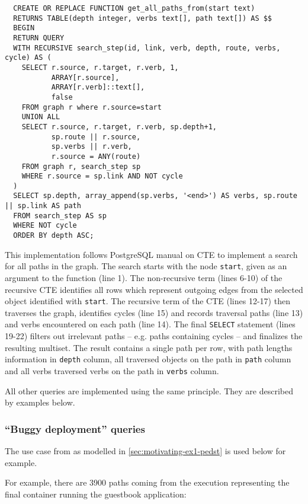 \begin{verbatim}
  CREATE OR REPLACE FUNCTION get_all_paths_from(start text)
  RETURNS TABLE(depth integer, verbs text[], path text[]) AS $$
  BEGIN
  RETURN QUERY
  WITH RECURSIVE search_step(id, link, verb, depth, route, verbs, cycle) AS (
    SELECT r.source, r.target, r.verb, 1,
           ARRAY[r.source],
           ARRAY[r.verb]::text[],
           false
    FROM graph r where r.source=start
    UNION ALL
    SELECT r.source, r.target, r.verb, sp.depth+1,
           sp.route || r.source,
           sp.verbs || r.verb,
           r.source = ANY(route)
    FROM graph r, search_step sp
    WHERE r.source = sp.link AND NOT cycle
  )
  SELECT sp.depth, array_append(sp.verbs, '<end>') AS verbs, sp.route || sp.link AS path
  FROM search_step AS sp
  WHERE NOT cycle
  ORDER BY depth ASC;
\end{verbatim}

This implementation follows PostgreSQL manual on CTE \cite{PostgreSQL-ctes-15:online}  to implement a search for all paths in the graph. The search starts with the node \texttt{start}, given as an argument to the function (line 1). The non-recursive term (lines 6-10) of the recursive CTE identifies all rows which represent outgoing edges from the selected object identified with \texttt{start}. The recursive term of the CTE (lines 12-17) then traverses the graph, identifies cycles (line 15) and records traversal paths (line 13) and verbs encountered on each path (line 14). The final \texttt{SELECT} statement (lines 19-22) filters out irrelevant paths -- e.g. paths containing cycles -- and finalizes the resulting multiset. The result contains a single path per row, with path lengths information in \texttt{depth} column, all traversed objects on the path in \texttt{path} column and all verbs traversed verbs on the path in \texttt{verbs} column.

All other queries are implemented using the same principle. They are described by examples below.

\subsubsection{``Buggy deployment'' queries}

The use case from  as modelled in \cref{sec:motivating-ex1-pedst} is used below for example.

For example, there are 3900 paths coming from the execution representing the final container running the guestbook application:


